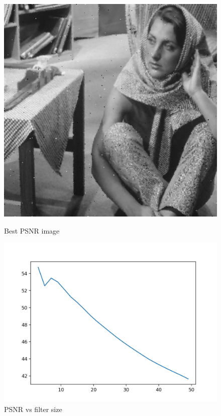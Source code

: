 \documentclass{article}
\begin{document}
    \begin{figure}[!htb]
      \includegraphics[scale=0.3]{./basic_denoising/barbara/median_best_sp.png}
      \caption{Best PSNR image}
    \endminipage \hfill
      \includegraphics[scale=.45]{./basic_denoising/barbara/median_psnr_sp.png}
      \caption{PSNR vs filter size}
    \endminipage
    \end{figure}
    \pagebreak
    
\end{document}
